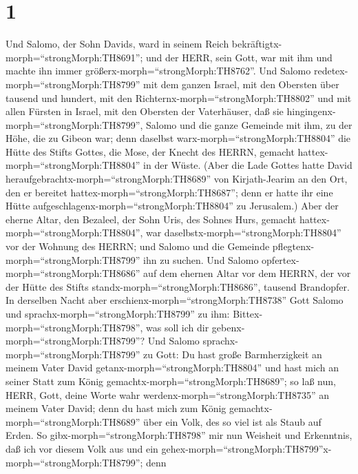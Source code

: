 \hypertarget{section}{%
\section{1}\label{section}}

 Und Salomo, der Sohn Davids, ward in seinem Reich
bekräftigtx-morph=``strongMorph:TH8691''; und der HERR, sein Gott, war
mit ihm und machte ihn immer größerx-morph=``strongMorph:TH8762''.
 Und Salomo redetex-morph=``strongMorph:TH8799'' mit dem
ganzen Israel, mit den Obersten über tausend und hundert, mit den
Richternx-morph=``strongMorph:TH8802'' und mit allen Fürsten in Israel,
mit den Obersten der Vaterhäuser,  daß sie
hingingenx-morph=``strongMorph:TH8799'', Salomo und die ganze Gemeinde
mit ihm, zu der Höhe, die zu Gibeon war; denn daselbst
warx-morph=``strongMorph:TH8804'' die Hütte des Stifts Gottes, die Mose,
der Knecht des HERRN, gemacht hattex-morph=``strongMorph:TH8804'' in der
Wüste.  (Aber die Lade Gottes hatte David
heraufgebrachtx-morph=``strongMorph:TH8689'' von Kirjath-Jearim an den
Ort, den er bereitet hattex-morph=``strongMorph:TH8687''; denn er hatte
ihr eine Hütte aufgeschlagenx-morph=``strongMorph:TH8804'' zu
Jerusalem.)  Aber der eherne Altar, den Bezaleel, der Sohn
Uris, des Sohnes Hurs, gemacht hattex-morph=``strongMorph:TH8804'', war
daselbstx-morph=``strongMorph:TH8804'' vor der Wohnung des HERRN; und
Salomo und die Gemeinde pflegtenx-morph=``strongMorph:TH8799'' ihn zu
suchen.  Und Salomo opfertex-morph=``strongMorph:TH8686''
auf dem ehernen Altar vor dem HERRN, der vor der Hütte des Stifts
standx-morph=``strongMorph:TH8686'', tausend Brandopfer.  In
derselben Nacht aber erschienx-morph=``strongMorph:TH8738'' Gott Salomo
und sprachx-morph=``strongMorph:TH8799'' zu ihm:
Bittex-morph=``strongMorph:TH8798'', was soll ich dir
gebenx-morph=``strongMorph:TH8799''?  Und Salomo
sprachx-morph=``strongMorph:TH8799'' zu Gott: Du hast große
Barmherzigkeit an meinem Vater David getanx-morph=``strongMorph:TH8804''
und hast mich an seiner Statt zum König
gemachtx-morph=``strongMorph:TH8689'';  so laß nun, HERR,
Gott, deine Worte wahr werdenx-morph=``strongMorph:TH8735'' an meinem
Vater David; denn du hast mich zum König
gemachtx-morph=``strongMorph:TH8689'' über ein Volk, des so viel ist als
Staub auf Erden.  So gibx-morph=``strongMorph:TH8798'' mir
nun Weisheit und Erkenntnis, daß ich vor diesem Volk aus und ein
gehex-morph=``strongMorph:TH8799''x-morph=``strongMorph:TH8799''; denn
